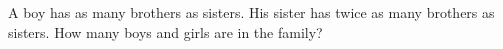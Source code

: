 A boy has as many brothers as sisters. His sister has twice as many brothers as sisters. How many boys and girls are in the family?
